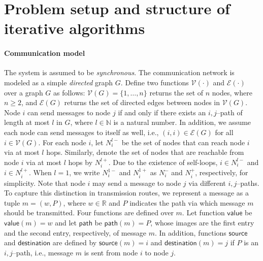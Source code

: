 \documentclass[letterpaper, 11pt]{article}
\newcommand{\naturals}{{\mathbb{N}}}
\newcommand{\calE}{{\mathcal{E}}}
\newcommand{\calV}{{\mathcal{V}}}
\begin{document}
\section{Problem setup and structure of iterative algorithms}
\label{sec: model}
\paragraph{Communication model}
The system is assumed to be {\em synchronous}.
The communication network is modeled as a simple {\em directed} graph $G$. Define two functions $\calV(\cdot)$ and $\calE(\cdot)$ over a graph $G$ as follows:  $\calV(G)=\{1,\dots,n\}$ returns the set of $n$ nodes, where $n\ge 2$, and $\calE(G)$ returns the set of directed edges between nodes in $\calV(G)$. Node $i$ can send messages to node $j$ if and only if there exists an $i,j$--path of length at most $l$ in $G$, where $l\in \naturals$ is a natural number.
In addition, we assume each node can send messages to itself as well, i.e., $(i,i)\in\calE(G)$ for all $i\in\calV(G)$. For each node $i$, let $N_i^{l-}$ be the set of nodes that can reach node $i$ via at most $l$ hops.
Similarly, denote the set of nodes that are reachable from node $i$ via at most $l$ hops by $N_i^{l+}$. Due to the existence of self-loops, $i\in N_i^{l-}$ and $i\in N_i^{l+}$. When $l=1$, we write $N_i^{1-}$ and $N_i^{1+}$ as $N_i^{-}$ and $N_i^{+}$, respectively, for simplicity.
Note that node $i$ may send a message to node $j$ via different $i, j$--paths. To capture this distinction in transmission routes, we represent a message as a tuple $m=(w, P)$, where $w\in \mathbb{R}$ and $P$ indicates the path via which message $m$ should be transmitted. Four functions are defined over $m$. Let function $\mathsf{value}$ be $\mathsf{value}(m)=w$ and let  $\mathsf{path}$ be $\mathsf{path}(m)=P$, whose images are the first entry and the second entry, respectively, of message $m$. In addition, functions $\mathsf{source}$ and $\mathsf{destination}$ are defined by  $\mathsf{source}(m)=i$ and $\mathsf{destination}(m)=j$ if  $P$ is an $i, j$--path, i.e., message $m$ is sent from node $i$ to node $j$.
\end{document}
